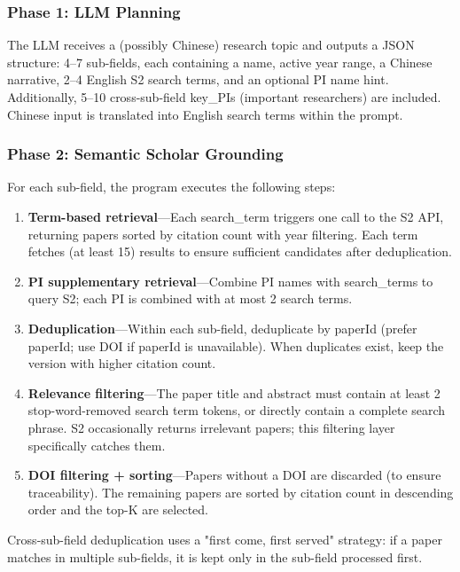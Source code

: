\subsubsection{Phase 1: LLM Planning}

The LLM receives a (possibly Chinese) research topic and outputs a JSON structure: 4--7 sub-fields,
each containing a name, active year range, a Chinese narrative, 2--4 English S2 search terms, and
an optional PI name hint. Additionally, 5--10 cross-sub-field key\_PIs (important researchers) are
included. Chinese input is translated into English search terms within the prompt.

\subsubsection{Phase 2: Semantic Scholar Grounding}

For each sub-field, the program executes the following steps:

\begin{enumerate}
  \item \textbf{Term-based retrieval}---Each search\_term triggers one call to the S2
     API, returning papers sorted by citation count with year filtering.
    Each term fetches  (at least 15) results to ensure sufficient candidates
    after deduplication.
  \item \textbf{PI supplementary retrieval}---Combine PI names with search\_terms to query S2;
    each PI is combined with at most 2 search terms.
  \item \textbf{Deduplication}---Within each sub-field, deduplicate by paperId (prefer paperId;
    use DOI if paperId is unavailable). When duplicates exist, keep the version with higher citation
    count.
  \item \textbf{Relevance filtering}---The paper title and abstract must contain at least 2
    stop-word-removed search term tokens, or directly contain a complete search phrase. S2
    occasionally returns irrelevant papers; this filtering layer specifically catches them.
  \item \textbf{DOI filtering + sorting}---Papers without a DOI are discarded (to ensure
    traceability). The remaining papers are sorted by citation count in descending order and the
    top-K are selected.
\end{enumerate}

Cross-sub-field deduplication uses a "first come, first served" strategy: if a paper matches in
multiple sub-fields, it is kept only in the sub-field processed first.

